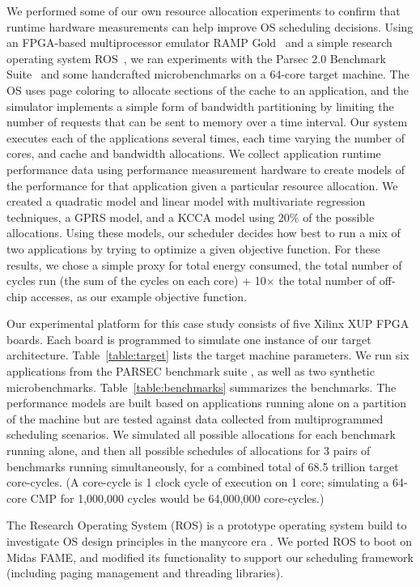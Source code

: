 We performed some of our own resource allocation experiments to
confirm that runtime hardware measurements can help improve OS
scheduling decisions.  Using an FPGA-based multiprocessor emulator RAMP Gold~\cite{rampgold09, rampgold10, fame10} and
a simple research operating system ROS~\cite{ros, tess,tess_resource}, we ran experiments with the Parsec
2.0 Benchmark Suite~\cite{parsec} and some handcrafted
microbenchmarks on a 64-core target machine. The OS uses page coloring
to allocate sections of the cache to an application, and the simulator
implements a simple form of bandwidth partitioning by limiting the
number of requests that can be sent to memory over a time
interval. Our system executes each of the applications several times,
each time varying the number of cores, and cache and bandwidth
allocations.  We collect application runtime performance data using
performance measurement hardware to create models of the performance
for that application given a particular resource allocation.  We
created a quadratic model and linear model with multivariate
regression techniques, a GPRS model, and a KCCA model using 20\% of the possible allocations.  Using
these models, our scheduler decides how best to run a mix of two
applications by trying to optimize a given objective function.  For
these results, we chose a simple proxy for total energy consumed, the
total number of cycles run (the sum of the cycles on each core) +
10$\times$ the total number of off-chip accesses, as our example
objective function.

Our experimental platform for this case study consists of five Xilinx
XUP FPGA boards. Each board is programmed to simulate one instance of
our target architecture.  Table~\ref{table:target} lists the target
machine parameters. We run six applications from the PARSEC benchmark
suite \cite{parsec}, as well as two synthetic microbenchmarks.
Table~\ref{table:benchmarks} summarizes the benchmarks. The
performance models are built based on applications running alone on a
partition of the machine but are tested against data collected from
multiprogrammed scheduling scenarios.  We simulated all possible
allocations for each benchmark running alone, and then all possible
schedules of allocations for 3 pairs of benchmarks running
simultaneously, for a combined total of 68.5 trillion target
core-cycles.  (A core-cycle is 1 clock cycle of execution on 1 core;
simulating a 64-core CMP for 1,000,000 cycles would be 64,000,000
core-cycles.)

 The Research Operating System (ROS) is a prototype operating system
 build to investigate OS design principles in the manycore era
 \cite{tess, tess_resource, tess_dac}.  We ported ROS to boot on Midas FAME, and
 modified its functionality to support our scheduling framework
 (including paging management and threading libraries).


